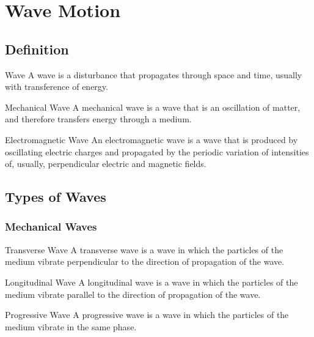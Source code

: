 \documentclass[12pt]{article}
\numberwithin{equation}{subsection}
\begin{document}
\section{Wave Motion}
\subsection{Definition}
\begin{definition}{Wave}{}
    A wave is a disturbance that propagates through space and time, usually with transference of energy.
\end{definition}

\begin{definition}{Mechanical Wave}{}
    A mechanical wave is a wave that is an oscillation of matter, and therefore transfers energy through a medium.
\end{definition}

\begin{definition}{Electromagnetic Wave}{}
    An electromagnetic wave is a wave that is produced by oscillating electric charges and propagated by the periodic variation of intensities of, usually, perpendicular electric and magnetic fields.
\end{definition}

\subsection{Types of Waves}

\subsubsection{Mechanical Waves}
\begin{definition}{Transverse Wave}{}
    A transverse wave is a wave in which the particles of the medium vibrate perpendicular to the direction of propagation of the wave.
\end{definition}

\begin{definition}{Longitudinal Wave}{}
    A longitudinal wave is a wave in which the particles of the medium vibrate parallel to the direction of propagation of the wave.
\end{definition}

\begin{definition}{Progressive Wave}{}
    A progressive wave is a wave in which the particles of the medium vibrate in the same phase.
\end{definition}
\end{document}
